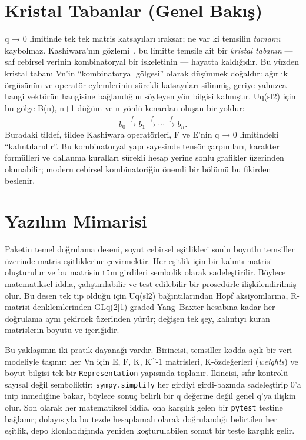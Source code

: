 \documentclass[12pt,a4paper]{report}
\numberwithin{equation}{chapter}
\theoremstyle{plain}
\theoremstyle{definition}
\begin{document}
\chapter{Kristal Tabanlar (Genel Bakış)}

q → 0 limitinde tek tek matris katsayıları ıraksar; ne var ki temsilin
\emph{tamamı} kaybolmaz. Kashiwara'nın gözlemi~\cite{Kashiwara,HK}, bu limitte temsile ait bir
\emph{kristal tabanın} --- saf cebirsel verinin kombinatoryal bir iskeletinin ---
hayatta kaldığıdır. Bu yüzden kristal tabanı Vn'in ``kombinatoryal gölgesi''
olarak düşünmek doğaldır: ağırlık örgüsünün ve operatör eylemlerinin sürekli
katsayıları silinmiş, geriye yalnızca hangi vektörün hangisine bağlandığını
söyleyen yön bilgisi kalmıştır. Uq(sl2) için bu gölge B(n), n+1 düğüm ve n
yönlü kenardan oluşan bir yoldur:
\[
  b_0 \xrightarrow{\tilde{f}} b_1 \xrightarrow{\tilde{f}} \cdots
  \xrightarrow{\tilde{f}} b_n.
\]
Buradaki tildef, tildee Kashiwara operatörleri, F ve E'nin
q → 0 limitindeki ``kalıntılarıdır''. Bu kombinatoryal yapı sayesinde tensör
çarpımları, karakter formülleri ve dallanma kuralları sürekli hesap yerine
sonlu grafikler üzerinden okunabilir; modern cebirsel kombinatoriğin önemli bir
bölümü bu fikirden beslenir.

\chapter{Yazılım Mimarisi}

Paketin temel doğrulama deseni, soyut cebirsel eşitlikleri sonlu boyutlu
temsiller üzerinde matris eşitliklerine çevirmektir. Her eşitlik için bir kalıntı
matrisi oluşturulur ve bu matrisin tüm girdileri sembolik olarak sadeleştirilir.
Böylece matematiksel iddia, çalıştırılabilir ve test edilebilir bir prosedürle
ilişkilendirilmiş olur. Bu desen tek tip olduğu için Uq(sl2) bağıntılarından Hopf
aksiyomlarına, R-matrisi denklemlerinden GLq(2|1) graded Yang--Baxter
hesabına kadar her doğrulama aynı çekirdek üzerinden yürür; değişen tek şey,
kalıntıyı kuran matrislerin boyutu ve içeriğidir.

Bu yaklaşımın iki pratik dayanağı vardır. Birincisi, temsiller kodda açık bir
veri modeliyle taşınır: her Vn için E, F, K, K^-1 matrisleri,
K-özdeğerleri (\emph{weights}) ve boyut bilgisi tek bir \texttt{Representation}
yapısında toplanır. İkincisi, sıfır kontrolü sayısal değil semboliktir;
\texttt{sympy.simplify} her girdiyi girdi-bazında sadeleştirip 0'a inip
inmediğine bakar, böylece sonuç belirli bir q değerine değil genel q'ya
ilişkin olur. Son olarak her matematiksel iddia, ona karşılık gelen bir
\texttt{pytest} testine bağlanır; dolayısıyla bu tezde hesaplamalı olarak
doğrulandığı belirtilen her eşitlik, depo klonlandığında yeniden koşturulabilen
somut bir teste karşılık gelir.
\end{document}
